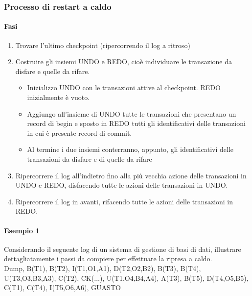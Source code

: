 \subsubsection{Processo di restart a caldo}
\paragraph{Fasi}
\begin{enumerate}
	\item Trovare l'ultimo checkpoint (ripercorrendo il log a ritroso)
	\item Costruire gli insiemi UNDO e REDO, cioè individuare le transazione da disfare e quelle da rifare. 
	\begin{itemize}
		\item Inizializzo UNDO con le transazioni attive al checkpoint. REDO inizialmente è vuoto.
		\item Aggiungo all'insieme di UNDO tutte le transazioni che presentano un record di begin e sposto in REDO tutti gli identificativi delle transazioni in cui è presente record di commit.
		\item Al termine i due insiemi conterranno, appunto, gli identificativi delle transazioni da disfare e di quelle da rifare
	\end{itemize}
	\item Ripercorrere il log all'indietro fino alla più vecchia azione delle transazioni in UNDO e REDO, disfacendo tutte le azioni delle transazioni in UNDO.
	\item Ripercorrere il log in avanti, rifacendo tutte le azioni delle transazioni in REDO.
\end{enumerate}
\paragraph{Esempio 1} Considerando il seguente log di un sistema di gestione di basi di dati, illustrare dettagliatamente i passi da compiere per effettuare la ripresa a caldo.\\

\noindent Dump, B(T1), B(T2), I(T1,O1,A1), D(T2,O2,B2), B(T3), B(T4), U(T3,O3,B3,A3), C(T2), CK($\boxed{\dots}$), U(T1,O4,B4,A4), A(T3), B(T5), D(T4,O5,B5), C(T1), C(T4), I(T5,O6,A6), GUASTO

